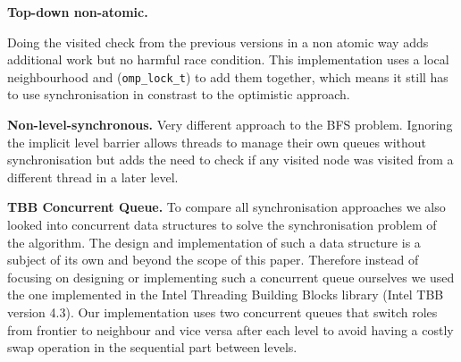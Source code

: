 \documentclass[letterpaper]{article}
\newcommand{\mypar}[1]{{\bf #1.}} %
\begin{document}
		\mypar{Top-down non-atomic}

		Doing the visited check from the previous versions in a non atomic way adds additional work but no harmful race condition.
		This implementation uses a local neighbourhood and (\verb+omp_lock_t+) to add them together, which means it still has to use synchronisation in constrast to the optimistic approach.

		\mypar{Non-level-synchronous}
		Very different approach to the BFS problem. Ignoring the implicit level barrier allows threads to manage their own queues without synchronisation but adds the need to check if any visited node was visited from a different thread in a later level.


		\mypar{TBB Concurrent Queue}
		To compare all synchronisation approaches we also looked into concurrent data structures to solve the synchronisation problem of the algorithm.
		The design and implementation of such a data structure is a subject of its own and beyond the scope of this paper. Therefore instead of focusing on designing or implementing such a concurrent queue ourselves we used the one implemented in the Intel Threading Building Blocks library (Intel TBB version 4.3).
		Our implementation uses two concurrent queues that switch roles from frontier to neighbour and vice versa after each level to avoid having a costly swap operation in the sequential part between levels.
\end{document}
